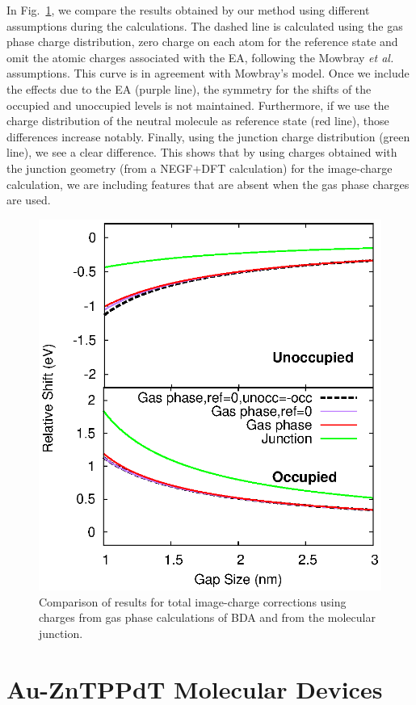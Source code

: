 \documentclass[aip,jcp,a4paper,reprint,floatfix,superscriptaddress]{revtex4-1}
\newcommand{\etal}{\emph{et al.}\xspace}
\begin{document}
In Fig.~\ref{fg:gas_vs_junction_BDA}, we compare the results obtained by our method using different assumptions during the calculations. The dashed line is calculated using the gas phase charge distribution, zero charge on each atom for the reference state and omit the atomic charges associated with the EA, following the Mowbray \etal assumptions. This curve is in agreement with Mowbray's model. Once we include the effects due to the EA (purple line), the symmetry for the shifts of the occupied and unoccupied levels is not maintained. Furthermore, if we use the charge distribution of the neutral molecule as reference state (red line), those differences increase notably. Finally, using the junction charge distribution (green line), we see a clear difference. This shows that by using charges obtained with the junction geometry (from a NEGF+DFT calculation) for the image-charge calculation, we are including features that are absent when the gas phase charges are used.

\begin{figure}
\includegraphics[width=.8\columnwidth]{img/Methods/Us_vs_Mowbraygas_BDA-ref}
\caption{Comparison of results for total image-charge corrections using charges from gas phase calculations of BDA and from the molecular junction.} \label{fg:gas_vs_junction_BDA}
\end{figure}




\section{Au-ZnTPPdT Molecular Devices} \label{Sec:ZnTPP}
\end{document}
